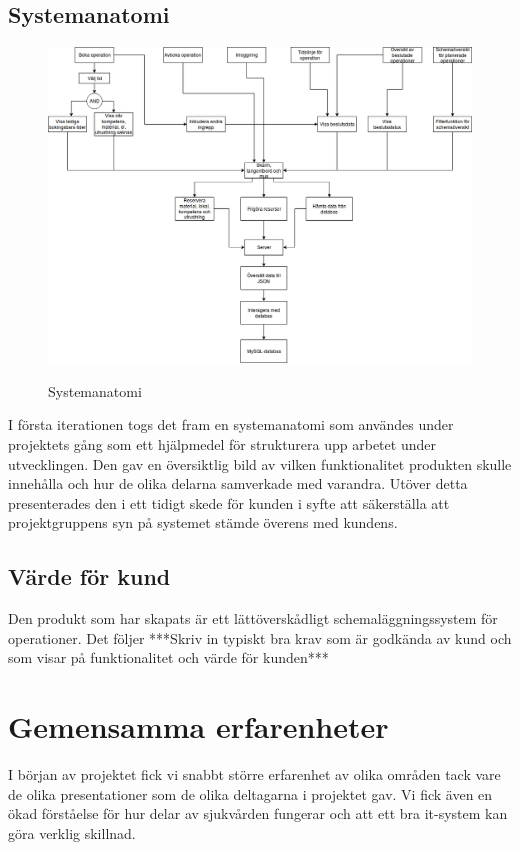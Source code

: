 \subsection{Systemanatomi}
\begin{figure}
    \includegraphics[width=\textwidth,height=.4\textheight]{Figures/Systemanatomi.png}\\
    \caption{Systemanatomi}
    \label{fig:Systemanatomi}
\end{figure}

I första iterationen togs det fram en systemanatomi som användes under projektets gång som ett hjälpmedel för strukturera upp arbetet under utvecklingen. Den gav en översiktlig bild av vilken funktionalitet produkten skulle innehålla och hur de olika delarna samverkade med varandra. Utöver detta presenterades den i ett tidigt skede för kunden i syfte att säkerställa att projektgruppens syn på systemet stämde överens med kundens.

\subsection{Värde för kund}
Den produkt som har skapats är ett lättöverskådligt schemaläggningssystem för operationer. Det följer ***Skriv in typiskt bra krav som är godkända av kund och som visar på funktionalitet och värde för kunden***

\section{Gemensamma erfarenheter}
I början av projektet fick vi snabbt större erfarenhet av olika områden
tack vare de olika presentationer som de olika deltagarna i projektet gav.
Vi fick även en ökad förståelse för hur delar av sjukvården fungerar och att ett bra
it-system kan göra verklig skillnad.

